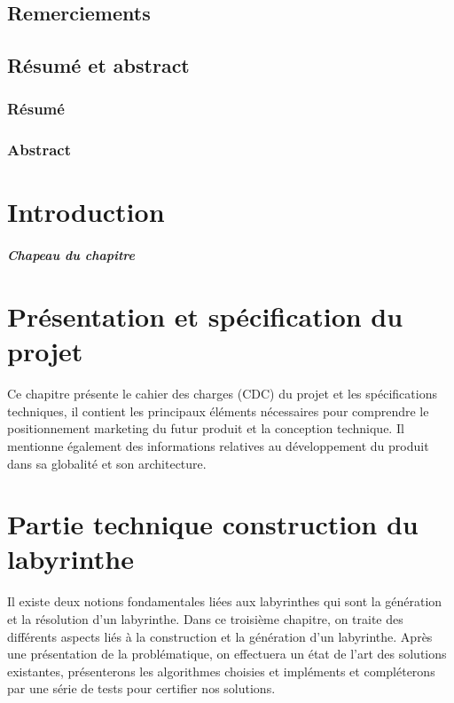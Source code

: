 \documentclass[12pt, french]{report}
\begin{document}

\clearpage

\thispagestyle{empty}
\section*{Remerciements}

\clearpage
\thispagestyle{empty}
\section*{Résumé et abstract}
\subsection*{Résumé}

\subsection*{Abstract}

\clearpage
\setcounter{page}{1}
\tableofcontents
\listoffigures

\clearpage

\chapter{Introduction}
\paragraph{Chapeau du chapitre}

\clearpage

\chapter{Présentation et spécification du projet}
Ce chapitre présente le cahier des charges (CDC) du projet et les
spécifications techniques, il contient les principaux éléments nécessaires
pour comprendre le positionnement marketing du futur produit et la
conception technique. Il mentionne également des informations relatives au
développement du produit dans sa globalité et son architecture.


\clearpage

\chapter{Partie technique construction du labyrinthe}
Il existe deux notions fondamentales liées aux labyrinthes qui sont la génération et la résolution d'un labyrinthe. 
Dans ce troisième chapitre, on traite des différents aspects liés à la construction et la génération d'un labyrinthe.
Après une présentation de la problématique, on effectuera un état de l'art des solutions existantes, présenterons les algorithmes choisies et impléments et compléterons par une série de tests pour certifier nos solutions.

\clearpage
\end{document}
